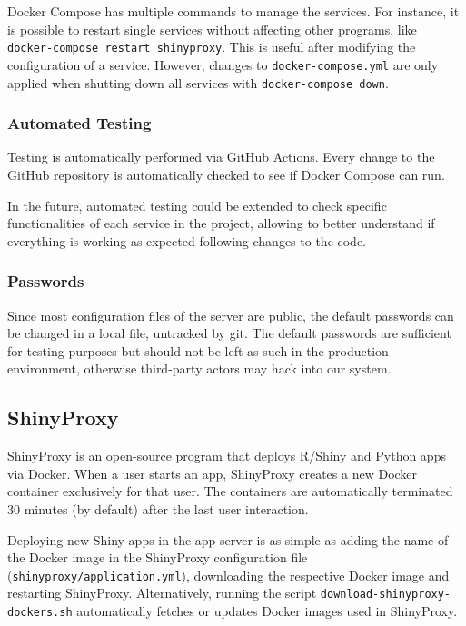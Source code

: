 Docker Compose has multiple commands to manage the services. For instance, it is possible to restart single services without affecting other programs, like \texttt{docker-compose restart shinyproxy}. This is useful after modifying the configuration of a service. However, changes to \texttt{docker-compose.yml} are only applied when shutting down all services with \texttt{docker-compose down}.


\subsubsection{Automated Testing}

Testing is automatically performed via GitHub Actions. Every change to the GitHub repository is automatically checked to see if Docker Compose can run.

In the future, automated testing could be extended to check specific functionalities of each service in the project, allowing to better understand if everything is working as expected following changes to the code.

\subsubsection{Passwords}

Since most configuration files of the server are public, the default passwords can be changed in a local file, untracked by git. The default passwords are sufficient for testing purposes but should not be left as such in the production environment, otherwise third-party actors may hack into our system.

\subsection{ShinyProxy}

ShinyProxy is an open-source program that deploys R/Shiny and Python apps via Docker. When a user starts an app, ShinyProxy creates a new Docker container exclusively for that user. The containers are automatically terminated 30 minutes (by default) after the last user interaction.

Deploying new Shiny apps in the app server is as simple as adding the name of the Docker image in the ShinyProxy configuration file (\texttt{shinyproxy/application.yml}), downloading the respective Docker image and restarting ShinyProxy. Alternatively, running the script \texttt{download-shinyproxy-dockers.sh} automatically fetches or updates Docker images used in ShinyProxy.

